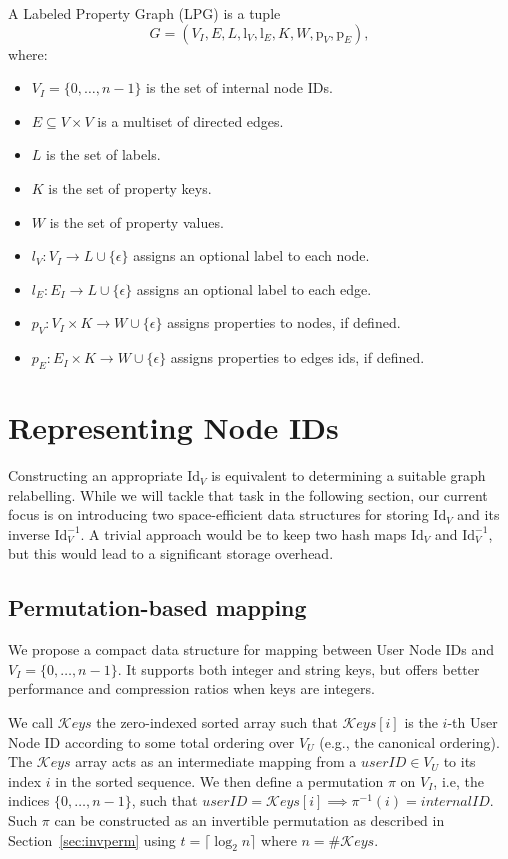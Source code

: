 \begin{definition}
    A Labeled Property Graph (LPG) is a tuple
    \[
        G = (V_I, E, L, \mathrm{l}_V, \mathrm{l}_E, K, W, \mathrm{p}_V, \mathrm{p}_E),
    \]
    where:
    \begin{itemize}
        \item $V_I = \{0,\dots, n-1\}$ is the set of internal node IDs.
        \item $E \subseteq V \times V$ is a multiset of directed edges.
        \item $L$ is the set of labels.
        \item $K$ is the set of property keys.
        \item $W$ is the set of property values.
        \item $l_V: V_I \to L \cup \{\epsilon\}$ assigns an optional label to each node.
        \item $l_E: E_I \to L \cup \{\epsilon\}$ assigns an optional label to each edge.
        \item $p_V: V_I \times K \to W \cup \{\epsilon\}$ assigns properties to nodes, if defined.
        \item $p_E: E_I \times K \to W \cup \{\epsilon\}$ assigns properties to edges ids, if defined.
    \end{itemize}
\end{definition}

\section{Representing Node IDs}
Constructing an appropriate $\mathrm{Id}_V$ is equivalent to determining a suitable graph relabelling. While we will tackle that task in the following section, our current focus is on introducing two space-efficient data structures for storing $\mathrm{Id}_V$ and its inverse $\mathrm{Id}_V^{-1}$.
A trivial approach would be to keep two hash maps $\mathrm{Id}_V$ and $\mathrm{Id}_V^{-1}$, but this would lead to a significant storage overhead. 


\subsection{Permutation-based mapping}
We propose a compact data structure for mapping between User Node IDs and $V_I = \{ 0, \dots, n - 1\}$. It supports both integer and string keys, but offers better performance and compression ratios when keys are integers.

We call $\mathcal{K}eys$ the zero-indexed sorted array such that $\mathcal{K}eys[i]$ is the $i$-th User Node ID according to some total ordering over $V_U$ (e.g., the canonical ordering). The $\mathcal{K}eys$ array acts as an intermediate mapping from a $userID \in V_U$ to its index $i$ in the sorted sequence. We then define a permutation $\pi$ on $V_I$, i.e, the indices $\{0, \dots, n - 1\}$, such that $\mathit{userID} = \mathcal{K}eys[i] \implies \pi^{-1}(i) = \mathit{internalID}$. Such $\pi$ can be constructed as an invertible permutation as described in Section~\ref{sec:invperm} using $t = \lceil \log_2 n \rceil$ where $n = \#\mathcal{K}eys$. 

